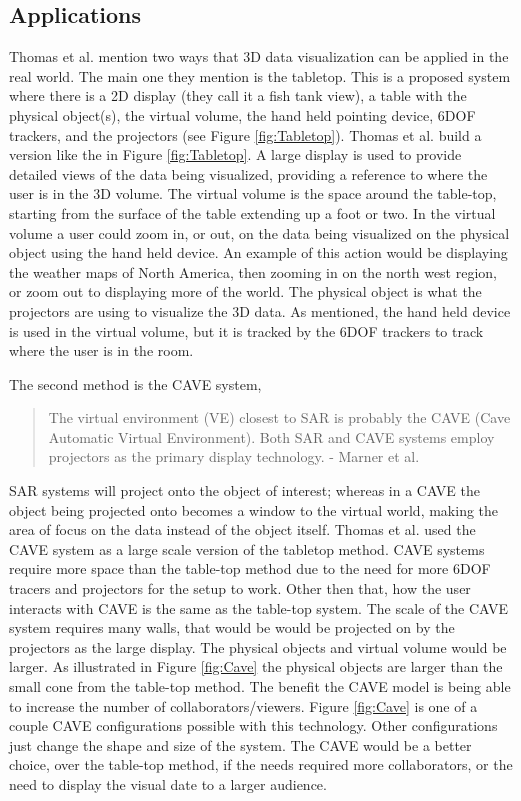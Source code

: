 \documentclass{sig-alternate}
\begin{document}
\subsection{Applications}
\label{sec:3D Applications}
Thomas et al. \cite{3D} mention two ways that 3D data visualization can be applied in the real world. The main one they mention is the tabletop. This is a proposed system where there is a 2D display (they call it a fish tank view), a table with the physical object(s), the virtual volume, the hand held pointing device, 6DOF trackers, and the projectors (see Figure \ref{fig:Tabletop}). Thomas et al. \cite{3D} build a version like the in Figure \ref{fig:Tabletop}. A large display is used to provide detailed views of the data being visualized, providing a reference to where the user is in the 3D volume. The virtual volume is the space around the table-top, starting from the surface of the table extending up a foot or two. In the virtual volume a user could zoom in, or out, on the data being visualized on the physical object using the hand held device. An example of this action would be displaying the weather maps of North America, then zooming in on the north west region, or zoom out to displaying more of the world. The physical object is what the projectors are using to visualize the 3D data. As mentioned, the hand held device is used in the virtual volume, but it is tracked by the 6DOF trackers to track where the user is in the room.

The second method is the CAVE system,
\begin{quote}
	The virtual environment (VE) closest to SAR is probably the CAVE (Cave Automatic Virtual Environment). Both SAR and CAVE systems employ projectors as the primary display technology. - Marner et al. \cite{CAVE}
\end{quote}
SAR systems will project onto the object of interest; whereas in a CAVE the object being projected onto becomes a window to the virtual world, making the area of focus on the data instead of the object itself. Thomas et al. \cite{3D} used the CAVE system as a large scale version of the tabletop method. CAVE systems require more space than the table-top method due to the need for more 6DOF tracers and projectors for the setup to work. Other then that, how the user interacts with CAVE is the same as the table-top system. The scale of the CAVE system requires many walls, that would be would be projected on by the projectors as the large display. The physical objects and virtual volume would be larger. As illustrated in Figure \ref{fig:Cave} the physical objects are larger than the small cone from the table-top method. The benefit the CAVE model is being able to increase the number of collaborators/viewers. Figure \ref{fig:Cave} is one of a couple CAVE configurations possible with this technology. Other configurations just change the shape and size of the system. The CAVE would be a better choice, over the table-top method, if the needs required more collaborators, or the need to display the visual date to a larger audience. 
\end{document}
